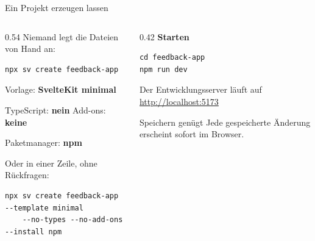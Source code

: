 \begin{frame}[fragile]{Ein Projekt erzeugen lassen}
  \begin{columns}[onlytextwidth,t]
    \begin{column}{0.54\textwidth}
      Niemand legt die Dateien von Hand an:
\begin{lstlisting}[style=term]
npx sv create feedback-app
\end{lstlisting}
      \footnotesize
      \begin{tugitemize}
        \item Vorlage: \textbf{SvelteKit minimal}
        \item TypeScript: \textbf{nein} \quad Add-ons: \textbf{keine}
        \item Paketmanager: \textbf{npm}
      \end{tugitemize}
      Oder in einer Zeile, ohne Rückfragen:
\begin{lstlisting}[style=term]
npx sv create feedback-app --template minimal
    --no-types --no-add-ons --install npm
\end{lstlisting}
    \end{column}
    \begin{column}{0.42\textwidth}
      \textbf{Starten}
\begin{lstlisting}[style=term]
cd feedback-app
npm run dev
\end{lstlisting}
      \footnotesize Der Entwicklungsserver läuft auf\\
      \url{http://localhost:5173}

      \begin{block}{Speichern genügt}
        \footnotesize Jede gespeicherte Änderung erscheint sofort im Browser.
      \end{block}
    \end{column}
  \end{columns}
\end{frame}

